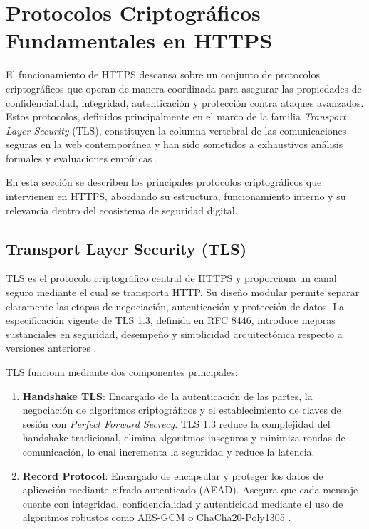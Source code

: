 \section{Protocolos Criptográficos Fundamentales en HTTPS}

El funcionamiento de HTTPS descansa sobre un conjunto de protocolos criptográficos que operan de manera coordinada para asegurar las propiedades de confidencialidad, integridad, autenticación y protección contra ataques avanzados. Estos protocolos, definidos principalmente en el marco de la familia \textit{Transport Layer Security} (TLS), constituyen la columna vertebral de las comunicaciones seguras en la web contemporánea y han sido sometidos a exhaustivos análisis formales y evaluaciones empíricas \cite{rfc8446, dowling2015}.

En esta sección se describen los principales protocolos criptográficos que intervienen en HTTPS, abordando su estructura, funcionamiento interno y su relevancia dentro del ecosistema de seguridad digital.

\subsection{Transport Layer Security (TLS)}

TLS es el protocolo criptográfico central de HTTPS y proporciona un canal seguro mediante el cual se transporta HTTP. Su diseño modular permite separar claramente las etapas de negociación, autenticación y protección de datos. La especificación vigente de TLS 1.3, definida en RFC 8446, introduce mejoras sustanciales en seguridad, desempeño y simplicidad arquitectónica respecto a versiones anteriores \cite{rfc8446}.

TLS funciona mediante dos componentes principales:

\begin{enumerate}
    \item \textbf{Handshake TLS}: Encargado de la autenticación de las partes, la negociación de algoritmos criptográficos y el establecimiento de claves de sesión con \textit{Perfect Forward Secrecy}. TLS 1.3 reduce la complejidad del handshake tradicional, elimina algoritmos inseguros y minimiza rondas de comunicación, lo cual incrementa la seguridad y reduce la latencia.
    
    \item \textbf{Record Protocol}: Encargado de encapsular y proteger los datos de aplicación mediante cifrado autenticado (AEAD). Asegura que cada mensaje cuente con integridad, confidencialidad y autenticidad mediante el uso de algoritmos robustos como AES-GCM o ChaCha20-Poly1305 \cite{rfc7525}.
\end{enumerate}

